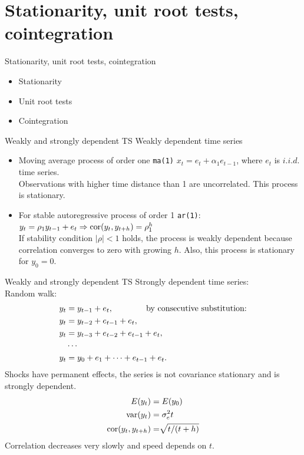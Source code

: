 \documentclass{beamer}
\begin{document}
\section{Stationarity, unit root tests, cointegration}
\begin{frame}{Stationarity, unit root tests, cointegration}
  \begin{itemize}
      \item Stationarity
      \bigskip
      \item Unit root tests
      \bigskip
      \item Cointegration
  \end{itemize}  
\end{frame}
\begin{frame}{Weakly and strongly dependent TS}
Weakly dependent time series
  \vspace{0.4cm}
\begin{itemize}
  \item Moving average process of order one \texttt{ma(1)} $x_t=e_t+\alpha_1 e_{t-1}$, where $e_t$ is $\textit{i.i.d.}$ time series. \\Observations with higher time distance than 1 are uncorrelated. This process is stationary.
  \vspace{0.7cm}
  \item For stable autoregressive process of order 1 \texttt{ar(1)}: \\ \smallskip
  $y_t = \rho_1 y_{t-1} + e_t \Rightarrow \textnormal{cor}(y_t,y_{t+h})=\rho^h_1$\\
  \vspace{0.4cm}
  If stability condition $|\rho|<1$  holds, the process is weakly dependent because correlation converges to zero with growing $h$. Also, this process is stationary for $y_0 =0$.
  \vspace{0.4cm}
\end{itemize}
\end{frame}
\begin{frame}{Weakly and strongly dependent TS}
Strongly dependent time series:\\
Random walk:  
\begin{align}\nonumber
y_t &= y_{t-1}+e_t, \qquad \qquad \textnormal{by consecutive substitution:} \\\nonumber 
y_t &= y_{t-2}+e_{t-1}+e_t, \\\nonumber
y_t &= y_{t-3}+e_{t-2}+e_{t-1}+e_t, \\\nonumber
& \cdots \\ \nonumber
y_t &= y_0 + e_1 + \dots +e_{t-1} + e_t.
\end{align} 
Shocks have permanent effects, the series is not covariance stationary and is strongly dependent.
\begin{align}\nonumber
E(y_t) & =E(y_0) \\\nonumber
\textnormal{var}(y_t) & =\sigma^2_e t \\\nonumber
\textnormal{cor}(y_t,y_{t+h}) & =\sqrt[]{t/(t+h)}
\end{align} 
Correlation decreases very slowly and speed depends on $t$.
\end{frame}
\end{document}
